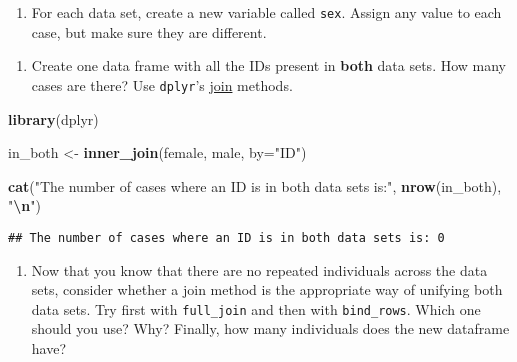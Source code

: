 \documentclass[
]{book}
\newenvironment{Shaded}{\begin{snugshade}}{\end{snugshade}}
\newcommand{\AttributeTok}[1]{\textcolor[rgb]{0.13,0.29,0.53}{#1}}
\newcommand{\FunctionTok}[1]{\textcolor[rgb]{0.13,0.29,0.53}{\textbf{#1}}}
\newcommand{\NormalTok}[1]{#1}
\newcommand{\OtherTok}[1]{\textcolor[rgb]{0.56,0.35,0.01}{#1}}
\newcommand{\SpecialCharTok}[1]{\textcolor[rgb]{0.81,0.36,0.00}{\textbf{#1}}}
\newcommand{\StringTok}[1]{\textcolor[rgb]{0.31,0.60,0.02}{#1}}
\providecommand{\tightlist}{%
  \setlength{\itemsep}{0pt}\setlength{\parskip}{0pt}}
\begin{document}
\begin{enumerate}
\def\labelenumi{\arabic{enumi}.}
\tightlist
\item
  For each data set, create a new variable called \texttt{sex}. Assign any value to each case, but make sure they are different.
\end{enumerate}

\begin{Shaded}
\end{Shaded}

\begin{enumerate}
\def\labelenumi{\arabic{enumi}.}
\setcounter{enumi}{1}
\tightlist
\item
  Create one data frame with all the IDs present in \textbf{both} data sets. How many cases are there? Use \texttt{dplyr}'s \href{https://www.geeksforgeeks.org/joining-data-in-r-with-dplyr-package/}{join} methods.
\end{enumerate}

\begin{Shaded}
\begin{Highlighting}[]
\FunctionTok{library}\NormalTok{(dplyr)}

\NormalTok{in\_both }\OtherTok{\textless{}{-}} \FunctionTok{inner\_join}\NormalTok{(female, male, }\AttributeTok{by=}\StringTok{"ID"}\NormalTok{)}

\FunctionTok{cat}\NormalTok{(}\StringTok{"The number of cases where an ID is in both data sets is:"}\NormalTok{, }\FunctionTok{nrow}\NormalTok{(in\_both), }\StringTok{"}\SpecialCharTok{\textbackslash{}n}\StringTok{"}\NormalTok{)}
\end{Highlighting}
\end{Shaded}

\begin{verbatim}
## The number of cases where an ID is in both data sets is: 0
\end{verbatim}

\begin{enumerate}
\def\labelenumi{\arabic{enumi}.}
\setcounter{enumi}{2}
\tightlist
\item
  Now that you know that there are no repeated individuals across the data sets, consider whether a join method is the appropriate way of unifying both data sets. Try first with \texttt{full\_join} and then with \texttt{bind\_rows}. Which one should you use? Why? Finally, how many individuals does the new dataframe have?
\end{enumerate}
\end{document}
